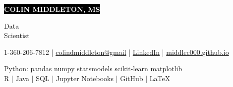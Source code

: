 \documentclass[11pt]{developercv} %
\newcommand{\vsp}{\vspace{-10pt}}
\begin{document}
\setlength{\abovedisplayskip}{0pt}
\setlength{\belowdisplayskip}{0pt}

\begin{minipage}{0.75\textwidth}
	\colorbox{black}{{\HUGE\textcolor{white}{\textbf{\MakeUppercase{Colin Middleton, MS}}}}}
\end{minipage}
\begin{minipage}{0.25\textwidth}
	{\huge Data \\Scientist}
\end{minipage}



\vspace{-5pt}

\begin{center}
	1-360-206-7812
	\hspace{0.25cm} | \hspace{0.25cm}
	\href{mailto:colindmiddleton@gmail.com}{colindmiddleton@gmail}
	\hspace{0.25cm} | \hspace{0.25cm}
	\href{https://www.linkedin.com/in/colin-middleton-000/}{LinkedIn}
	\hspace{0.25cm} | \hspace{0.25cm}
	\href{https://middlec000.github.io/}{middlec000.github.io}
\end{center}

\vsp


\vsp

\begin{center}
	Python: \quad pandas \quad numpy \quad statsmodels \quad scikit-learn \quad matplotlib 
	\\
	\vspace{0.25cm}
	R \quad | \quad Java \quad | \quad SQL \quad | \quad
	Jupyter Notebooks \quad | \quad GitHub \quad | \quad LaTeX
\end{center}

\vsp
\end{document}
